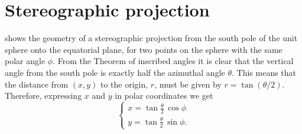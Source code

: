 \documentclass[11pt,a4paper, 
swedish, english %
]{article}
\begin{document}
\section{Stereographic projection}
\swapcommands{\phi}{\varphi}

\begin{figure}\centering
\caption{}
\label{fig:stereographic}
\end{figure}

 shows the geometry of a stereographic
projection from the south pole of the unit sphere onto the equatorial
plane, for two points on the sphere with the same polar angle
$\phi$. From the Theorem of inscribed angles it is clear that the
vertical angle from the south pole is exactly half the azimuthal
angle $\theta$. This means that the distance from $(x,y)$ to the
origin, $r$, must be given by $r=\tan(\theta/2)$. Therefore,
expressing $x$ and $y$ in polar coordinates we get
\begin{equation}
\begin{cases}
x=\tan\tfrac{\theta}{2}\,\cos\phi\\
y=\tan\tfrac{\theta}{2}\,\sin\phi.
\end{cases}
\end{equation}
\end{document}
